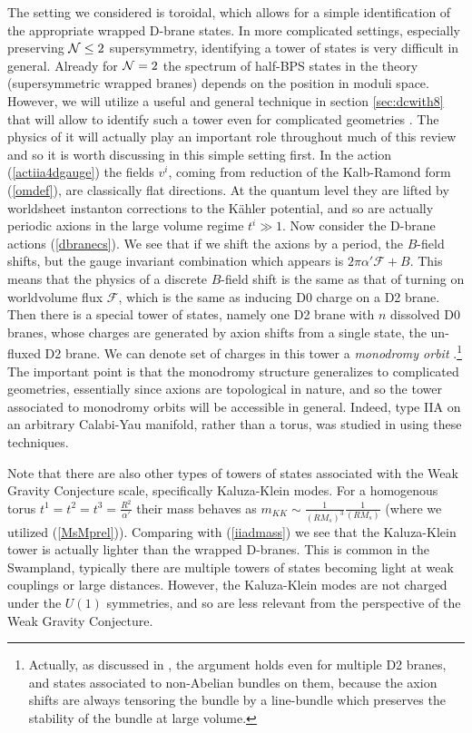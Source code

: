 \documentclass[11pt,a4paper]{article}
\numberwithin{equation}{section}
\numberwithin{table}{section}\setlength{\multlinegap}{25pt}
\newcommand{\cF}{\mathcal{F}}
\begin{document}
The setting we considered is toroidal, which allows for a simple identification of the appropriate wrapped D-brane states. In more complicated settings, especially preserving ${\cal N} \leq 2$ supersymmetry, identifying a tower of states is very difficult in general. Already for ${\cal N}=2$ the spectrum of half-BPS states in the theory (supersymmetric wrapped branes) depends on the position in moduli space. However, we will utilize a useful and general technique in section \ref{sec:dcwith8} that will allow to identify such a tower even for complicated geometries \cite{Grimm:2018ohb}. The physics of it will actually play an important role throughout much of this review and so it is worth discussing in this simple setting first. In the action (\ref{actiia4dgauge}) the fields $v^i$, coming from reduction of the Kalb-Ramond form (\ref{omdef}), are classically flat directions. At the quantum level they are lifted by worldsheet instanton corrections to the K{\"a}hler potential, and so are actually periodic axions in the large volume regime $t^i \gg 1$. Now consider the D-brane actions (\ref{dbranecs}). We see that if we shift the axions by a period, the $B$-field shifts, but the gauge invariant combination which appears is $2 \pi \alpha' \cF + B$.  This means that the physics of a discrete $B$-field shift is the same as that of turning on worldvolume flux $\cF$, which is the same as inducing D0 charge on a D2 brane. Then there is a special tower of states, namely one D2 brane with $n$ dissolved D0 branes, whose charges are generated by axion shifts from a single state, the un-fluxed D2 brane. We can denote set of charges in this tower a {\it monodromy orbit} \cite{Grimm:2018ohb}.\footnote{Actually, as discussed in \cite{Grimm:2018ohb}, the argument holds even for multiple D2 branes, and states associated to non-Abelian bundles on them, because the axion shifts are always tensoring the bundle by a line-bundle which preserves the stability of the bundle at large volume.} The important point is that the monodromy structure generalizes to complicated geometries, essentially since axions are topological in nature, and so the tower associated to monodromy orbits will be accessible in general. Indeed, type IIA on an arbitrary Calabi-Yau manifold, rather than a torus, was studied in \cite{Corvilain:2018lgw} using these techniques. 

Note that there are also other types of towers of states associated with the Weak Gravity Conjecture scale, specifically Kaluza-Klein modes. For a homogenous torus $t^1=t^2=t^3=\frac{R^2}{\alpha'}$ their mass behaves as $m_{KK} \sim \frac{1}{\left(R M_s\right)^3}\frac{1}{\left(R M_s\right)}$ (where we utilized (\ref{MsMprel})). Comparing with (\ref{iiadmass}) we see that the Kaluza-Klein tower is actually lighter than the wrapped D-branes. This is common in the Swampland, typically there are multiple towers of states becoming light at weak couplings or large distances. However, the Kaluza-Klein modes are not charged under the $U(1)$ symmetries, and so are less relevant from the perspective of the Weak Gravity Conjecture.
\end{document}
